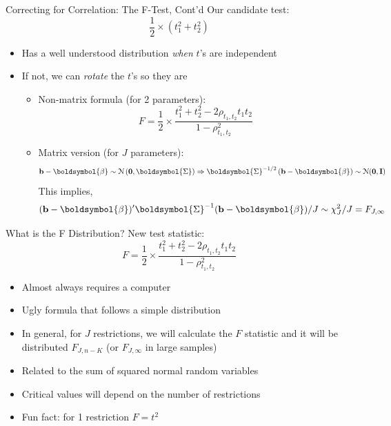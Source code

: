 \documentclass[aspectratio=169,11pt]{beamer}
\begin{document}
\begin{frame}{Correcting for Correlation: The F-Test, Cont'd}
Our candidate test:
	\[
		\frac{1}{2}\times (t_1^2 + t_2^2)
	\]

\begin{itemize}
	\item Has a well understood distribution \emph{when} $t$'s are independent
	\item If not, we can \emph{rotate} the $t$'s so they are
	\begin{itemize}
		\item Non-matrix formula (for 2 parameters):
		\[
			F = \frac{1}{2}\times\frac{t_1^2 + t_2^2 - 2\rho_{t_1,t_2}t_1t_2}{1-\rho_{t_1,t_2}^2}
		\]
		\item Matrix version (for $J$ parameters):
		\[
			{\bf b}-\boldsymbol{\beta}\sim\mathcal{N}\left({\bf 0},\boldsymbol{\Sigma}\right)\Rightarrow \boldsymbol{\Sigma}^{-1/2}\left({\bf b}-\boldsymbol{\beta}\right)\sim\mathcal{N}({\bf 0},{\bf I})
		\]
		This implies,
		\[
		({\bf b}-\boldsymbol{\beta})'\boldsymbol{\Sigma}^{-1}({\bf b}-\boldsymbol{\beta})/J\sim\chi^2_J/J = F_{J,\infty}
		\]
		
		
	\end{itemize}	
\end{itemize}	
\end{frame}

\begin{frame}{What is the F Distribution?}
New test statistic:
		\[
			F = \frac{1}{2}\times\frac{t_1^2 + t_2^2 - 2\rho_{t_1,t_2}t_1t_2}{1-\rho_{t_1,t_2}^2}
		\]

\begin{itemize}
	\item Almost always requires a computer
	\item Ugly formula that follows a simple distribution
	\item In general, for $J$ restrictions, we will calculate the $F$ statistic and it will be distributed $F_{J,n-K}$ (or $F_{J,\infty}$ in large samples)
	\item Related to the sum of squared normal random variables
	\item Critical values will depend on the number of restrictions
	\item Fun fact: for 1 restriction $F = t^2$
\end{itemize}

	
\end{frame}
\end{document}
